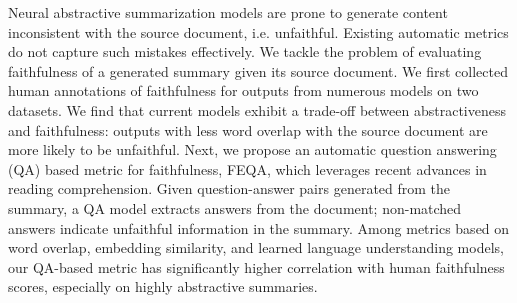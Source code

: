 Neural abstractive summarization models are prone to generate content inconsistent with the source document, i.e. unfaithful. Existing automatic metrics do not capture such mistakes effectively. We tackle the problem of evaluating faithfulness of a generated summary given its source document. We first collected human annotations of faithfulness for outputs from numerous models on two datasets. We find that current models exhibit a trade-off between abstractiveness and faithfulness: outputs with less word overlap with the source document are more likely to be unfaithful. Next, we propose an automatic question answering (QA) based metric for faithfulness, FEQA, which leverages recent advances in reading comprehension. Given question-answer pairs generated from the summary, a QA model extracts answers from the document; non-matched answers indicate unfaithful information in the summary. Among metrics based on word overlap, embedding similarity, and learned language understanding models, our QA-based metric has significantly higher correlation with human faithfulness scores, especially on highly abstractive summaries.
